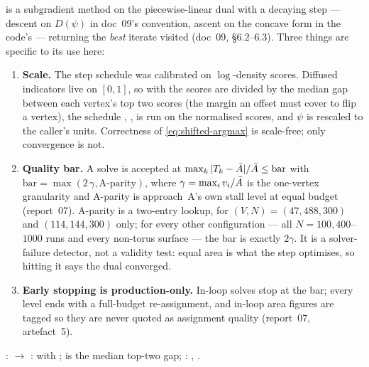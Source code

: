 \documentclass[11pt,a4paper]{article}
\begin{document}
 is a subgradient method on the piecewise-linear dual
with a decaying step --- descent on $D(\psi)$ in doc~09's convention, ascent on
the concave form in the code's --- returning the \emph{best} iterate visited
(doc~09, \S6.2--6.3). Three things are specific to its use here:
\begin{enumerate}[itemsep=1pt]
  \item \textbf{Scale.} The step schedule was calibrated on $\log$-density
    scores. Diffused indicators live on $[0, 1]$, so with
     the scores are divided by the median gap
    between each vertex's top two scores (the margin an offset must cover to
    flip a vertex), the schedule ,
    ,  is run on the
    normalised scores, and $\psi$ is rescaled to the caller's units. Correctness
    of \eqref{eq:shifted-argmax} is scale-free; only convergence is not.
  \item \textbf{Quality bar.} A solve is accepted at
    $\max_k |T_k - \bar{A}|/\bar{A} \le \text{bar}$ with
    $\text{bar} = \max(2\,\gamma, \text{A-parity})$, where
    $\gamma = \max_i v_i / \bar{A}$ is the one-vertex granularity and A-parity is
    approach~A's own stall level at equal budget (report~07). A-parity is a
    two-entry lookup, for $(V, N) = (47{,}488, 300)$ and $(114{,}144, 300)$ only;
    for every other configuration --- all $N = 100, 400$--$1000$ runs and every
    non-torus surface --- the bar is exactly $2\gamma$. It is a solver-failure
    detector, not a validity test: equal area is what the step optimises, so
    hitting it says the dual converged.
  \item \textbf{Early stopping is production-only.} In-loop solves stop at the
    bar; every level ends with a full-budget re-assignment, and in-loop area
    figures are tagged  so they are never quoted as
    assignment quality (report~07, artefact~5).
\end{enumerate}

\begin{tcolorbox}[colback=blue!4!white, colframe=blue!40!black,
                  title={Code: the balanced threshold}, fontupper=\small]
: 
$\to$ : 
with ;
 is the median top-two gap;
: ,
.
\end{tcolorbox}
\end{document}
